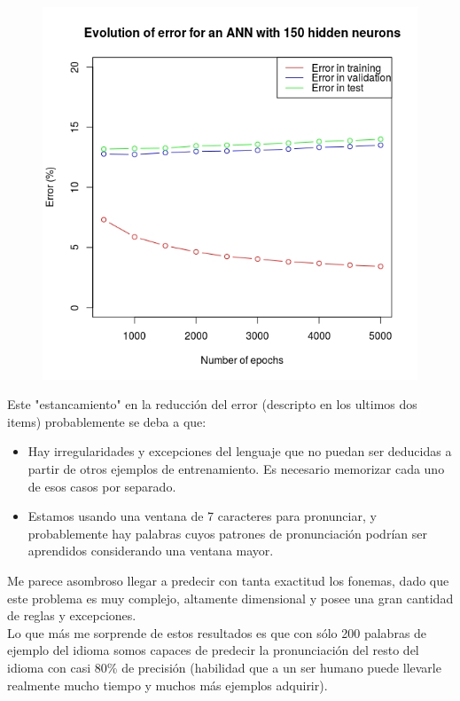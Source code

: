 \documentclass[paper=a4, fontsize=11pt]{scrartcl} %
\numberwithin{equation}{section} %
\numberwithin{figure}{section} %
\numberwithin{table}{section} %
\begin{document}
\begin{figure}[h!]
\centering
\includegraphics[width=112mm]{annresults2.jpg}
\end{figure}

Este "estancamiento" en la reducción del error (descripto en los ultimos dos items) probablemente se deba a que:

\begin{itemize}
\item Hay irregularidades y excepciones del lenguaje que no puedan ser deducidas a partir de otros ejemplos de entrenamiento. Es necesario memorizar cada uno de esos casos por separado.
\item Estamos usando una ventana de 7 caracteres para pronunciar, y probablemente hay palabras cuyos patrones de pronunciación podrían ser aprendidos considerando una ventana mayor.
\end{itemize}


Me parece asombroso llegar a predecir con tanta exactitud los fonemas, dado que este problema es muy complejo, altamente dimensional y posee una gran cantidad de reglas y excepciones. \\

Lo que más me sorprende de estos resultados es que con sólo 200 palabras de ejemplo del idioma somos capaces de predecir la pronunciación del resto del idioma con casi 80\% de precisión (habilidad que a un ser humano puede llevarle realmente mucho tiempo y muchos más ejemplos adquirir). \\
\end{document}
